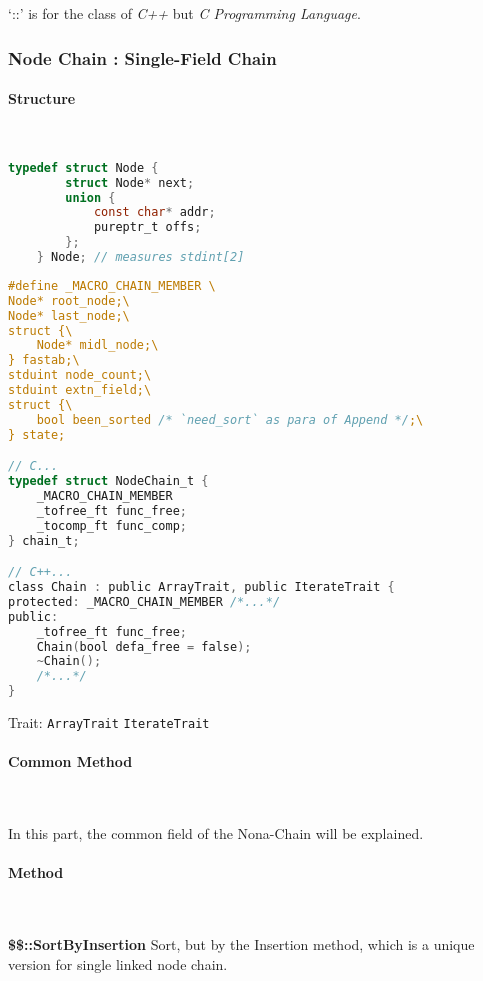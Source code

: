 `::' is for the class of \textit{C++} but \textit{C Programming Language}.

\subsubsection{Node Chain : Single-Field Chain}

\paragraph{Structure} \

\lstset{style=GlobalC}
\begin{lstlisting}[language=C]
	typedef struct Node {
		struct Node* next;
		union {
			const char* addr;
			pureptr_t offs;
		};
	} Node; // measures stdint[2]
\end{lstlisting}

\lstset{style=GlobalC}
\begin{lstlisting}[language=C]
#define _MACRO_CHAIN_MEMBER \
Node* root_node;\
Node* last_node;\
struct {\
	Node* midl_node;\
} fastab;\
stduint node_count;\
stduint extn_field;\
struct {\
	bool been_sorted /* `need_sort` as para of Append */;\
} state;

// C...
typedef struct NodeChain_t {
	_MACRO_CHAIN_MEMBER
	_tofree_ft func_free;
	_tocomp_ft func_comp;
} chain_t;

// C++...
class Chain : public ArrayTrait, public IterateTrait {
protected: _MACRO_CHAIN_MEMBER /*...*/
public:
	_tofree_ft func_free;
	Chain(bool defa_free = false);
	~Chain();
	/*...*/
}

\end{lstlisting}
Trait:  \verb|ArrayTrait| \verb|IterateTrait|

\paragraph{Common Method} \

In this part, the common field of the Nona-Chain will be explained.



\paragraph{Method} \


\textbf{\$\$::SortByInsertion} Sort, but by the Insertion method, which is a unique version for single linked node chain.



